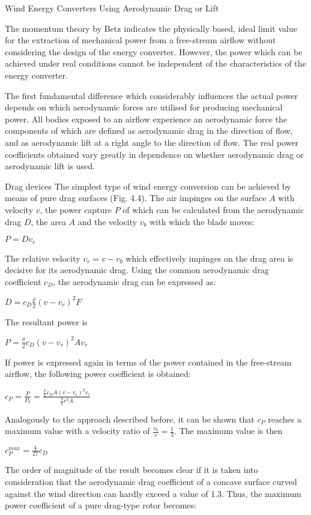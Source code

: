 Wind Energy Converters Using Aerodynamic Drag or Lift

The momentum theory by Betz indicates the physically based, ideal limit value for the extraction of mechanical power from a free-stream airflow without considering the design of the energy converter. However, the power which can be achieved under real conditions cannot be independent of the characteristics of the energy converter.

The first fundamental difference which considerably influences the actual power depends on which aerodynamic forces are utilised for producing mechanical power. All bodies exposed to an airflow experience an aerodynamic force the components of which are defined as aerodynamic drag in the direction of flow, and as aerodynamic lift at a right angle to the direction of flow. The real power coefficients obtained vary greatly in dependence
on whether aerodynamic drag or aerodynamic lift is used.
 
Drag devices
The simplest type of wind energy conversion can be achieved by means of pure drag surfaces (Fig. 4.4). The air impinges on the surface $A$ with velocity $v$, the power capture $P$ of which can be calculated from the aerodynamic drag $D$, the area $A$ and the velocity $v_b$ with which the blade moves:  

$P = D v_r$

The relative velocity $v_r = v − v_b$ which effectively impinges on the drag area is decisive for its aerodynamic drag. Using the common aerodynamic drag coefficient $c_D$, the aerodynamic drag can be expressed as:

$D = c_D \frac{\rho}{2} (v -v_r)^2 F$

The resultant power is

$P = \frac{\rho}{2}c_D (v -v_r)^2 A v_r$

If power is expressed again in terms of the power contained in the free-stream airflow, the following power coefficient is obtained:

$c_P = \frac{P}{P_0} = \frac{\frac{\rho}{2} c_D A (v-v_r)^2 v_r}{\frac{\rho}{2} v^3 A}$

Analogously to the approach described before, it can be shown that $c_P$ reaches a maximum value with a velocity ratio of $\frac{v_b}{v} = \frac{1}{3}$. The maximum value is then

$c_{P}^{max} = \frac{4}{27}c_D$

The order of magnitude of the result becomes clear if it is taken into consideration that the aerodynamic drag coefficient of a concave surface curved against the wind direction can hardly exceed a value of 1.3. Thus, the maximum power coefficient of a pure drag-type rotor becomes:

